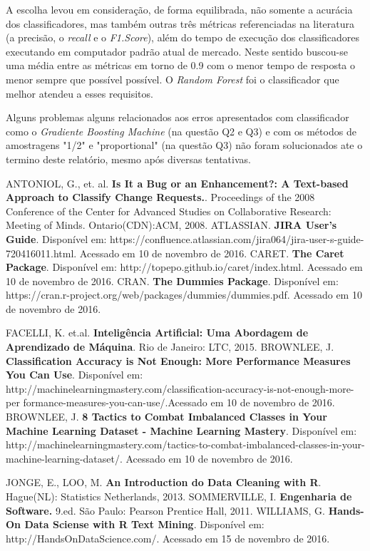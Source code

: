 \documentclass[11pt,twoside]{article}
\begin{document}
A escolha levou em consideração, de forma equilibrada, não somente a acurácia dos classificadores, 
mas também outras três métricas referenciadas na literatura (a precisão, o \textit{recall} e o \textit{F1.Score}), além do tempo de execução dos classificadores executando em computador padrão atual de mercado. Neste sentido buscou-se uma média entre as métricas em 
torno de 0.9 com o menor tempo de resposta o menor sempre que possível possível. O \textit{Random Forest} foi o classificador que melhor atendeu a esses requisitos. 

Alguns problemas alguns relacionados aos erros apresentados com classificador
como o \textit{Gradiente Boosting Machine} (na questão Q2 e Q3) e com os métodos de amostragens "1/2" e "proportional" (na questão Q3) não foram solucionados ate o termino deste relatório, mesmo após diversas tentativas.


\begin{thebibliography}{99}
 ANTONIOL, G., et. al.  {\bf Is It a Bug or an Enhancement?: A Text-based Approach to Classify Change Requests.}. Proceedings of the 2008 Conference of the 
Center for Advanced Studies on Collaborative Research: Meeting of Minds. Ontario(CDN):ACM, 2008.
 ATLASSIAN.  {\bf JIRA User's Guide}. Disponível em: https://confluence.atlassian.com/jira064/jira-user-s-guide-720416011.html.
Acessado em 10 de novembro de 2016.
 CARET.  {\bf The Caret Package}. Disponível em: 
http://topepo.github.io/caret/index.html. Acessado em 10 de novembro de 2016.
 CRAN.  {\bf The Dummies Package}. Disponível em: 
https://cran.r-project.org/web/packages/dummies/dummies.pdf. Acessado em 10 de novembro de 2016.

 FACELLI, K. et.al. {\bf Inteligência Artificial: Uma Abordagem de Aprendizado de Máquina}. Rio de Janeiro: LTC, 2015.
 BROWNLEE, J.  {\bf Classification Accuracy is Not Enough: More 
Performance Measures You Can Use}. Disponível em: 
http://machinelearningmastery.com/classification-accuracy-is-not-enough-more-per
formance-measures-you-can-use/.Acessado em 10 de novembro de 2016.
 BROWNLEE, J.  {\bf 8 Tactics to Combat Imbalanced Classes in Your Machine Learning Dataset - Machine Learning Mastery}. Disponível em: 
http://machinelearningmastery.com/tactics-to-combat-imbalanced-classes-in-your-machine-learning-dataset/. Acessado em 10 de novembro de 2016.

 JONGE, E., LOO, M. {\bf An Introduction do Data Cleaning with R}. Hague(NL): Statistics Netherlands, 2013.
 SOMMERVILLE, I. {\bf Engenharia de Software.} 9.ed. São Paulo: Pearson Prentice Hall, 2011.
 WILLIAMS, G. {\bf Hands-On Data Sciense with R Text Mining}. Disponível em: http://HandsOnDataScience.com/.
Acessado em 15 de novembro de 2016. 

\end{thebibliography}
\pagebreak
\end{document}
